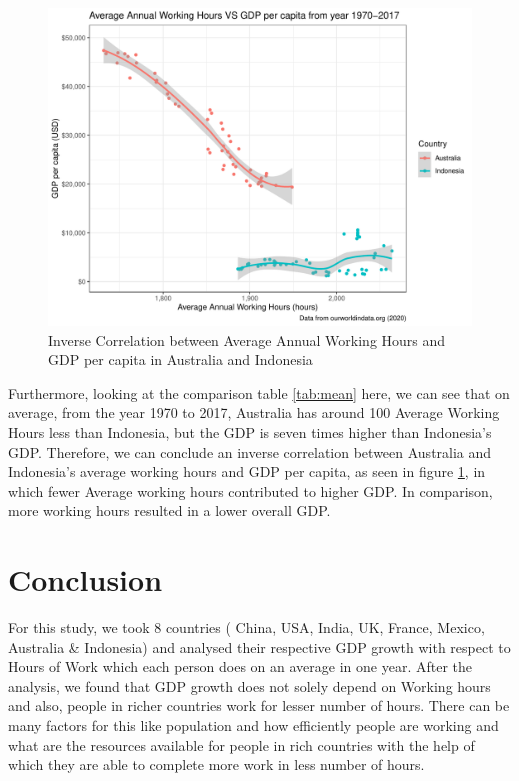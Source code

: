 \documentclass[11pt,a4paper,]{article}
\begin{document}
\clearpage

\begin{figure}
\centering
\includegraphics{report_files/figure-latex/scatter-1.pdf}
\caption{\label{fig:scatter}Inverse Correlation between Average Annual Working Hours and GDP per capita in Australia and Indonesia}
\end{figure}

Furthermore, looking at the comparison table \ref{tab:mean} here, we can see that on average, from the year 1970 to 2017, Australia has around 100 Average Working Hours less than Indonesia, but the GDP is seven times higher than Indonesia's GDP. Therefore, we can conclude an inverse correlation between Australia and Indonesia's average working hours and GDP per capita, as seen in figure \ref{fig:scatter}, in which fewer Average working hours contributed to higher GDP. In comparison, more working hours resulted in a lower overall GDP.

\clearpage

\hypertarget{conclusion}{%
\section{Conclusion}\label{conclusion}}

For this study, we took 8 countries ( China, USA, India, UK, France, Mexico, Australia \& Indonesia) and analysed their respective GDP growth with respect to Hours of Work which each person does on an average in one year. After the analysis, we found that GDP growth does not solely depend on Working hours and also, people in richer countries work for lesser number of hours. There can be many factors for this like population and how efficiently people are working and what are the resources available for people in rich countries with the help of which they are able to complete more work in less number of hours.

\printbibliography
\end{document}
